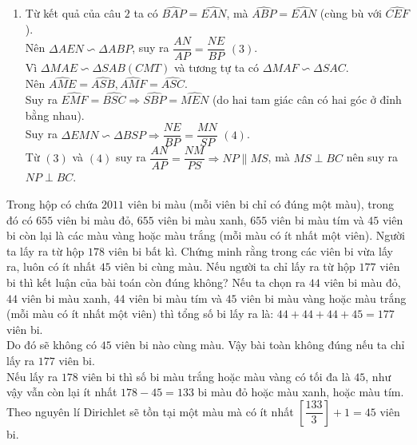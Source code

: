 \begin{ex}
{\begin{enumerate}
        Từ $(1)$ và $(2)$, suy ra $\Delta AEM \backsim \Delta ABS$.
        \item Từ kết quả của câu $2$ ta có $\widehat{BAP}= \widehat{EAN}$, mà $\widehat{ABP}= \widehat{EAN}$ (cùng bù với $ \widehat{CEF}$).\\
        Nên $\Delta AEN \backsim \Delta ABP$, suy ra $\dfrac{AN}{AP}= \dfrac{NE}{BP}$ $(3)$.\\
        Vì $\Delta MAE \backsim \Delta SAB (CMT)$ và tương tự ta có $\Delta MAF \backsim \Delta SAC$.\\
         Nên $\widehat{AME}= \widehat{ASB}, \widehat{AMF}= \widehat{ASC}$.\\
        Suy ra $\widehat{EMF}= \widehat{BSC} \Rightarrow \widehat{SBP}= \widehat{MEN}$ (do hai tam giác cân có hai góc ở đỉnh bằng nhau).\\
        Suy ra $\Delta EMN \backsim \Delta BSP \Rightarrow \dfrac{NE}{BP}= \dfrac{MN}{SP}$  $(4)$.\\
        Từ $(3)$ và $(4)$ suy ra $\dfrac{AN}{AP}= \dfrac{NM}{PS} \Rightarrow NP \parallel MS$, mà $MS \perp BC$ nên suy ra $NP \perp BC$.
    \end{enumerate}
    }
\end{ex}

\begin{ex}%
    Trong hộp có chứa $2011$ viên bi màu (mỗi viên bi chỉ có đúng một màu), trong đó có $655$ viên bi màu đỏ, $655$ viên bi màu xanh, $655$ viên bi màu tím và $45$ viên bi còn lại là các màu vàng hoặc màu trắng (mỗi màu có ít nhất một viên). Người ta lấy ra từ hộp $178$ viên bi bất kì. Chứng minh rằng trong các viên bi vừa lấy ra, luôn có ít nhất $45$ viên bi cùng màu. Nếu người ta chỉ lấy ra từ hộp $177$ viên bi thì kết luận của bài toán còn đúng không?  
\loigiai
    {
    Nếu ta chọn ra $44$ viên bi màu đỏ, $44$ viên bi màu xanh, $44$ viên bi màu tím và $45$ viên bi màu vàng hoặc màu trắng (mỗi màu có ít nhất một viên) thì tổng số bi lấy ra là: $44+44+44+45= 177$ viên bi.\\
    Do đó sẽ không có $45$ viên bi nào cùng màu. Vậy bài toàn không đúng nếu ta chỉ lấy ra $177$ viên bi.\\
    Nếu lấy ra $178$ viên bi thì số bi màu trắng hoặc màu vàng có tối đa là $45$, như vậy vẫn còn lại ít nhất $178-45= 133$  bi màu đỏ hoặc màu xanh, hoặc màu tím.\\
    Theo nguyên lí Dirichlet sẽ tồn tại một màu mà có ít nhất $\left[ \dfrac{133}{3} \right]+ 1= 45$ viên bi.
    }
\end{ex}
